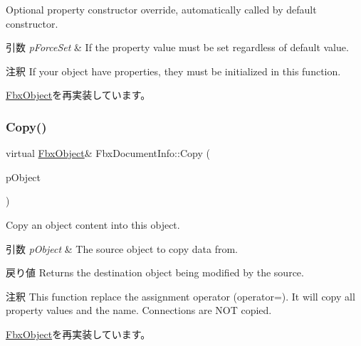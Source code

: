 Optional property constructor override, automatically called by default constructor. 
\begin{DoxyParams}{引数}
{\em p\+Force\+Set} & If the property value must be set regardless of default value. \\
\hline
\end{DoxyParams}
\begin{DoxyRemark}{注釈}
If your object have properties, they must be initialized in this function. 
\end{DoxyRemark}


\hyperlink{class_fbx_object_ad44f814323dc1b5e78bff1bfc608b4bb}{Fbx\+Object}を再実装しています。

\mbox{\label{class_fbx_document_info_ad8433a67149f705181ae78d29f6d99fe}} 
\subsubsection{\texorpdfstring{Copy()}{Copy()}}
{\footnotesize\ttfamily virtual \hyperlink{class_fbx_object}{Fbx\+Object}\& Fbx\+Document\+Info\+::\+Copy (\begin{DoxyParamCaption}\item[{const \hyperlink{class_fbx_object}{Fbx\+Object} \&}]{p\+Object }\end{DoxyParamCaption})\hspace{0.3cm}{\ttfamily [virtual]}}

Copy an object content into this object. 
\begin{DoxyParams}{引数}
{\em p\+Object} & The source object to copy data from. \\
\hline
\end{DoxyParams}
\begin{DoxyReturn}{戻り値}
Returns the destination object being modified by the source. 
\end{DoxyReturn}
\begin{DoxyRemark}{注釈}
This function replace the assignment operator (operator=). It will copy all property values and the name. Connections are N\+OT copied. 
\end{DoxyRemark}


\hyperlink{class_fbx_object_a0c0c5adb38284d14bb82c04d54504a3e}{Fbx\+Object}を再実装しています。

\mbox{\label{class_fbx_document_info_a799c245b74093eb0c68fddfbe3596cee}} 
